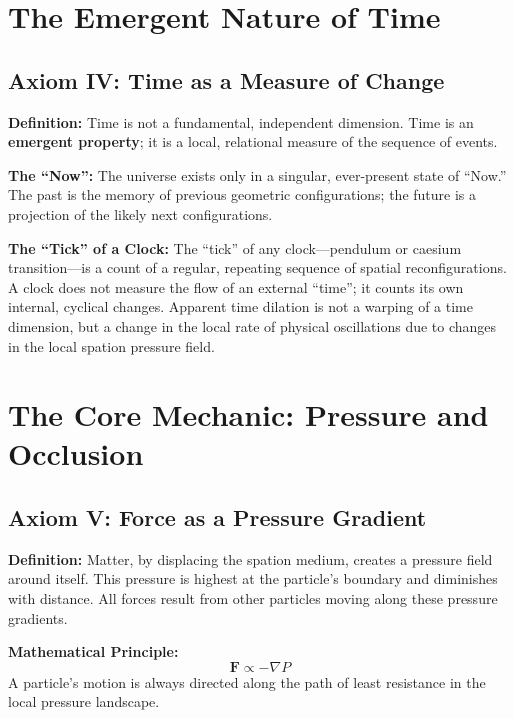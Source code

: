 \section{The Emergent Nature of Time}

\subsection{Axiom IV: Time as a Measure of Change}

\textbf{Definition:} Time is not a fundamental, independent dimension.  Time is an \textbf{emergent property}; it is a local, relational measure of the sequence of events.

\textbf{The ``Now'':} The universe exists only in a singular, ever-present state of ``Now.''  The past is the memory of previous geometric configurations; the future is a projection of the likely next configurations.

\textbf{The ``Tick'' of a Clock:} The ``tick'' of any clock---pendulum or caesium transition---is a count of a regular, repeating sequence of spatial reconfigurations.  A clock does not measure the flow of an external ``time''; it counts its own internal, cyclical changes.  Apparent time dilation is not a warping of a time dimension, but a change in the local rate of physical oscillations due to changes in the local spation pressure field.


\section{The Core Mechanic: Pressure and Occlusion}

\subsection{Axiom V: Force as a Pressure Gradient}

\textbf{Definition:} Matter, by displacing the spation medium, creates a pressure field around itself.  This pressure is highest at the particle's boundary and diminishes with distance.  All forces result from other particles moving along these pressure gradients.

\textbf{Mathematical Principle:}
\begin{equation}\label{eq:force-gradient}
  \mathbf{F} \propto -\nabla P
\end{equation}
A particle's motion is always directed along the path of least resistance in the local pressure landscape.

